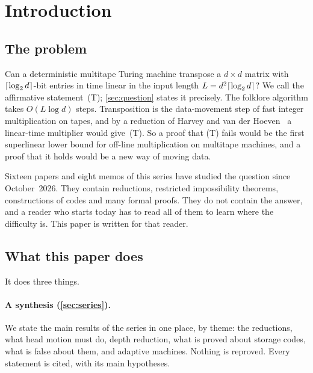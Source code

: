 \section{Introduction}\label{sec:intro}

\subsection{The problem}

Can a deterministic multitape Turing machine transpose a $d\times d$ matrix with $\lceil \log_2 d \rceil$-bit entries in time linear
in the input length $L=d^2\lceil \log_2 d \rceil$? We call the affirmative statement~(T); \cref{sec:question} states it precisely. The
folklore algorithm takes $O(L\log d)$ steps. Transposition is the data-movement step of fast integer multiplication on
tapes, and by a reduction of Harvey and van der Hoeven~\cite{HvdH2025} a linear-time multiplier would give~(T). So a
proof that (T) fails would be the first superlinear lower bound for off-line multiplication on multitape machines, and a
proof that it holds would be a new way of moving data.

Sixteen papers and eight memos of this series have studied the question since October~2026. They contain reductions,
restricted impossibility theorems, constructions of codes and many formal proofs. They do not contain the answer, and a
reader who starts today has to read all of them to learn where the difficulty is. This paper is written for that reader.

\subsection{What this paper does}

It does three things.

\paragraph{A synthesis (\cref{sec:series}).} We state the main results of the series in one place, by theme: the
reductions, what head motion must do, depth reduction, what is proved about storage codes, what is false about them, and
adaptive machines. Nothing is reproved. Every statement is cited, with its main hypotheses.

